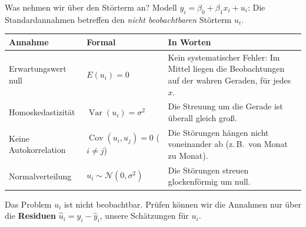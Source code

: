 \documentclass[aspectratio=169,11pt]{beamer}
\begin{document}
\begin{frame}{Was nehmen wir über den Störterm an?}
  \small
  Modell $y_i = \beta_0 + \beta_1 x_i + u_i$: Die Standardannahmen betreffen den
  \emph{nicht beobachtbaren} Störterm $u_i$.
  \begin{center}
    \renewcommand{\arraystretch}{1.08}
    \begin{tabular}{@{}l l L{7.2cm}@{}}
      \toprule
      \textbf{Annahme} & \textbf{Formal} & \textbf{In Worten} \\
      \midrule
      Erwartungswert null  & $E(u_i) = 0$ & Kein systematischer Fehler: Im Mittel liegen die Beobachtungen
                                            auf der wahren Geraden, für jedes $x$. \\
      Homoskedastizität    & $\operatorname{Var}(u_i) = \sigma^{2}$ & Die Streuung um die Gerade ist überall gleich groß. \\
      Keine Autokorrelation & $\operatorname{Cov}(u_i,u_j) = 0$ ($i \ne j$) & Die Störungen hängen nicht voneinander ab
                                            (z.\,B.\ von Monat zu Monat). \\
      Normalverteilung     & $u_i \sim \mathcal{N}(0,\sigma^{2})$ & Die Störungen streuen
                                            glockenförmig um null. \\
      \bottomrule
    \end{tabular}
  \end{center}
  \begin{alertblock}{Das Problem}
    $u_i$ ist nicht beobachtbar. Prüfen können wir die Annahmen nur über die
    \textbf{Residuen} $\hat{u}_i = y_i - \hat{y}_i$, unsere Schätzungen für $u_i$.
  \end{alertblock}
\end{frame}
\end{document}
